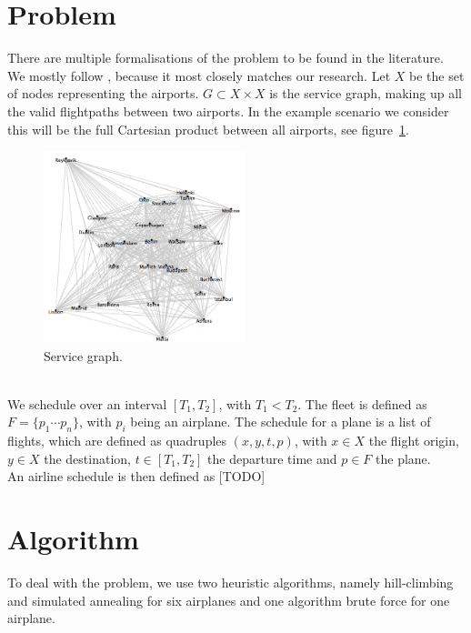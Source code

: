 \documentclass[journal]{IEEEtran}
\begin{document}
\section{Problem}
There are multiple formalisations of the problem to be found in the literature. We mostly follow \cite{Mashford2001}, because it most closely matches our research. Let $X$ be the set of nodes representing the airports. $G \subset X \times X$ is the service graph, making up all the valid flightpaths between two airports. In the example scenario we consider this will be the full Cartesian product between all airports, see figure~\ref{fig:service_graph}.
\\
\begin{figure}[!h]
\centering
\includegraphics[width=2.3in]{service_graph}
\caption{Service graph.}
\label{fig:service_graph}
\end{figure}
\\
We schedule over an interval $[T_1, T_2]$, with $T_1 < T_2$. The fleet is defined as $F = \{p_1 \cdots p_n\}$, with $p_i$ being an airplane. The schedule for a plane is a list of flights, which are defined as quadruples $(x, y, t, p)$, with $x \in X$ the flight origin, $y \in X$ the destination, $t \in [T_1, T_2]$ the departure time and $p\in F$ the plane. \\
An airline schedule is then defined as [TODO]
\section{Algorithm}
To deal with the problem, we use two heuristic algorithms, namely hill-climbing and simulated annealing for six airplanes and one algorithm brute force for one airplane.
\end{document}
